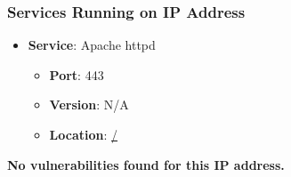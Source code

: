 \documentclass{article}
\begin{document}
\subsubsection*{Services Running on IP Address}

\begin{itemize}
    
        \item \textbf{Service}: Apache httpd
        \begin{itemize}
            \item \textbf{Port}: 443
            \item \textbf{Version}:  N/A 
            \item \textbf{Location}: \href{ / }{ / }
        \end{itemize}
    
\end{itemize}


\textbf{No vulnerabilities found for this IP address.}




\clearpage
\end{document}
